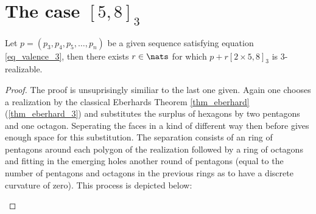 \section{The case $[5, 8]_3$}
\begin{theorem}
  Let $p = (p_3, p_4, p_5, \dots, p_n)$ be a given sequence satisfying equation \ref{eq_valence_3}, then there exists $r \in \nats$ for which $p + r [2 \times 5, 8]_3$ is $3$-realizable.
  \begin{proof}
    The proof is unsuprisingly similiar to the last one given. Again one chooses a realization by the classical Eberhards Theorem \ref{thm_eberhard}(\ref{thm_eberhard_3}) and substitutes the surplus of hexagons by two pentagons and one octagon. Seperating the faces in a kind of different way then before gives enough space for this substitution. The separation consists of an ring of pentagons around each polygon of the realization followed by a ring of octagons and fitting in the emerging holes another round of pentagons (equal to the number of pentagons and octagons in the previous rings as to have a discrete curvature of zero). This process is depicted below:

    \begin{figure}[htpp]
      \centering
\end{figure}
\end{proof}
\end{theorem}
